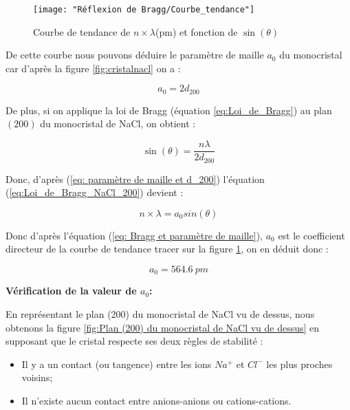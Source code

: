 \begin{figure}[h!]
	\centering
	\texttt{[image: "Réflexion de Bragg/Courbe\_tendance"]}
	\caption{Courbe de tendance de $n \times \lambda $(pm) et fonction de 	$\sin(\theta)$ }
	\label{fig:courbetendance}
\end{figure}


De cette courbe nous pouvons déduire le paramètre de maille $a_0$ du monocristal car d'après la figure \ref{fig:cristalnacl} on a :
	
	\begin{equation}\label{eq: paramètre de maille et d_200}
		a_0=2d_{200}
	\end{equation}

	
De plus, si on applique la loi de Bragg (équation \ref{eq:Loi_de_Bragg}) au plan $(200)$ du monocristal de NaCl, on obtient : 

\begin{equation} \label{eq:Loi_de_Bragg_NaCl_200}
	\sin (\theta ) = \frac{n \lambda }{2 d_{200}}
\end{equation}
	
	
Donc, d'après (\ref{eq: paramètre de maille et d_200}) l'équation (\ref{eq:Loi_de_Bragg_NaCl_200}) devient :
	
	\begin{equation}\label{eq: Bragg et paramètre de maille}
		n \times \lambda = a_0sin(\theta)
	\end{equation}
	
	
	Donc d'après l'équation (\ref{eq: Bragg et paramètre de maille}), $a_0$ est le coefficient directeur de la courbe  de tendance tracer sur la figure \ref{fig:courbetendance}, on en déduit donc :
	
	\begin{equation}
		\boxed{a_0 = 564.6 \ pm}
	\end{equation}
	




 \begin{flushleft}
	\textbf{Vérification de la valeur de $a_0$:}
\end{flushleft}



En représentant le plan (200) du monocristal de NaCl vu de dessus, nous obtenons la figure \ref{fig:Plan (200) du monocristal de NaCl vu de dessus} en supposant que le cristal respecte ses deux règles de stabilité :

\begin{itemize}
	\item Il y a un contact (ou tangence) entre les ions $Na^+$ et $Cl^-$ les plus proches voisins;
	\item Il n'existe aucun contact entre anions-anions ou cations-cations.
\end{itemize}
	



